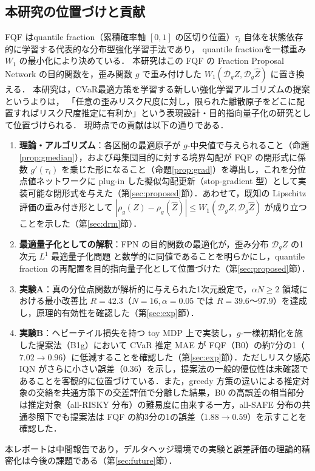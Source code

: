 \documentclass[a4paper,10pt]{jsarticle}
\theoremstyle{definition}
\newcommand{\Wone}{W_1}
\newcommand{\dist}{\mathcal{D}_g}
\begin{document}
\subsection{本研究の位置づけと貢献}
FQF \cite{yang2019fqf} はquantile fraction（累積確率軸 $[0, 1]$ の区切り位置）$\tau_i$ 自体を状態依存的に学習する代表的な分布型強化学習手法であり，
quantile fractionを一様重み $\Wone$ の最小化により決めている．
本研究はこの FQF の Fraction Proposal Network の目的関数を，歪み関数 $g$ で重み付けした $\Wone(\dist Z,\dist\hat{Z})$ に置き換える．
本研究は，CVaR最適方策を学習する新しい強化学習アルゴリズムの提案というよりは，
「任意の歪みリスク尺度に対し，限られた離散原子をどこに配置すればリスク尺度推定に有利か」という表現設計・目的指向量子化の研究として位置づけられる．
現時点での貢献は以下の通りである．
\begin{enumerate}
  \item \textbf{理論・アルゴリズム}：各区間の最適原子が $g$-中央値で与えられること（命題\ref{prop:gmedian}），および母集団目的に対する境界勾配が FQF の閉形式に係数 $g'(\tau_i)$ を乗じた形になること（命題\ref{prop:grad}）を導出し，これを分位点値ネットワークに plug-in した擬似勾配更新（stop-gradient 型）として実装可能な閉形式を与えた（第\ref{sec:proposed}節）．あわせて，既知の Lipschitz 評価の重み付き形として $|\rho_g(Z)-\rho_g(\hat Z)|\le \Wone(\dist Z,\dist \hat Z)$ が成り立つことを示した（第\ref{sec:drm}節）．
  \item \textbf{最適量子化としての解釈}：FPN の目的関数の最適化が，歪み分布 $\dist Z$ の1次元 $L^1$ 最適量子化問題 \cite{graf2000quantization} と数学的に同値であることを明らかにし，quantile fraction の再配置を目的指向量子化として位置づけた（第\ref{sec:proposed}節）．
  \item \textbf{実験A}：真の分位点関数が解析的に与えられた1次元設定で，$\alpha N\ge2$ 領域における最小改善比 $R=42.3$（$N=16, \alpha=0.05$ では $R=39.6$〜$97.9$）を達成し，原理的有効性を確認した（第\ref{sec:exp}節）．
  \item \textbf{実験B}：ヘビーテイル損失を持つ toy MDP 上で実装し，$g$-一様初期化を施した提案法（B1g）において CVaR 推定 MAE が FQF（B0）の約7分の1（$7.02\to0.96$）に低減することを確認した（第\ref{sec:exp}節）．ただしリスク感応 IQN がさらに小さい誤差（$0.36$）を示し，提案法の一般的優位性は未確認であることを客観的に位置づけている．また，greedy 方策の違いによる推定対象の交絡を共通方策下の交差評価で分離した結果，B0 の高誤差の相当部分は推定対象（all-RISKY 分布）の難易度に由来する一方，all-SAFE 分布の共通参照下でも提案法は FQF の約3分の1の誤差（$1.88\to0.59$）を示すことを確認した．
\end{enumerate}
本レポートは中間報告であり，デルタヘッジ環境での実験と誤差評価の理論的精密化は今後の課題である（第\ref{sec:future}節）．
\end{document}
